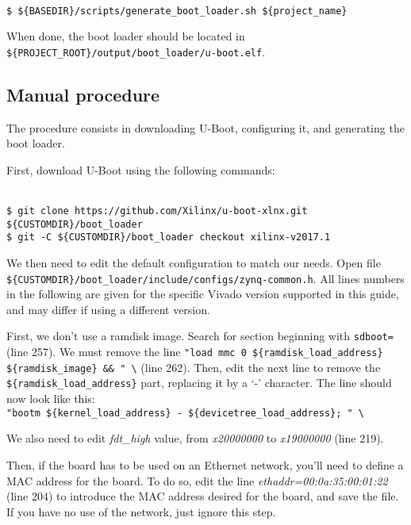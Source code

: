 \documentclass[openany,a4paper]{book}
\begin{document}
\begin{tabbing}
\kill \hspace{1cm} \= \\
\> \texttt{\$ \$\{BASEDIR\}/scripts/generate\_boot\_loader.sh \$\{project\_name\}}\\
\end{tabbing}

When done, the boot loader should be located in \nolinkurl{${PROJECT_ROOT}/output/boot_loader/u-boot.elf}.


\subsection{Manual procedure}

The procedure consists in downloading U-Boot, configuring it, and generating the boot loader.

First, download U-Boot using the following commands:

\begin{tabbing}
\kill \hspace{1cm} \= \\
\> \texttt{\$ git clone https://github.com/Xilinx/u-boot-xlnx.git \$\{CUSTOMDIR\}/boot\_loader} \\
\> \texttt{\$ git -C \$\{CUSTOMDIR\}/boot\_loader checkout xilinx-v2017.1} \\
\end{tabbing}

We then need to edit the default configuration to match our needs.
Open file \nolinkurl{${CUSTOMDIR}/boot_loader/include/configs/zynq-common.h}.
All lines numbers in the following are given for the specific Vivado version supported in this guide, and may differ if using a different version.

First, we don't use a ramdisk image.
Search for section beginning with \texttt{sdboot=} (line 257).
We must remove the line \texttt{"load mmc 0 \$\{ramdisk\_load\_address\} \$\{ramdisk\_image\} \&\& " \textbackslash} (line 262).
Then, edit the next line to remove the \texttt{\$\{ramdisk\_load\_address\}} part, replacing it by a `-' character.
The line should now look like this:\\\texttt{"bootm \$\{kernel\_load\_address\} - \$\{devicetree\_load\_address\}; " \textbackslash}

We also need to edit \textit{fdt\_high} value, from \textit{x20000000} to \textit{x19000000} (line 219).

Then, if the board has to be used on an Ethernet network, you'll need to define a MAC address for the board.
To do so, edit the line \textit{ethaddr=00:0a:35:00:01:22} (line 204) to introduce the MAC address desired for the board, and save the file.
If you have no use of the network, just ignore this step.
\end{document}
